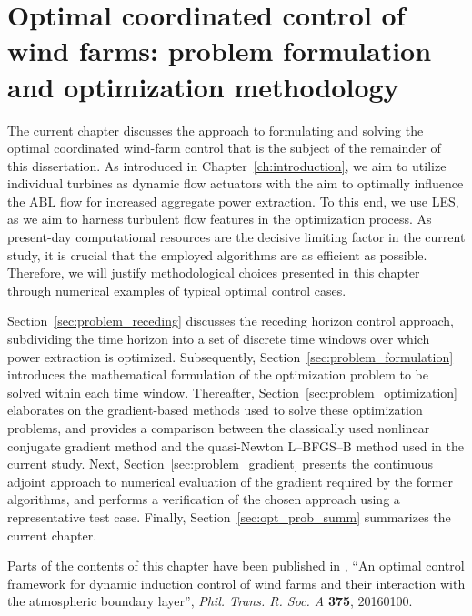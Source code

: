 \chapter{Optimal coordinated control of wind farms: problem formulation and optimization methodology}\label{ch:opt_formulation}

The current chapter discusses the approach to formulating and solving the optimal coordinated wind-farm control that is the subject of the remainder of this dissertation. As introduced in Chapter~\ref{ch:introduction}, we aim to utilize individual turbines as dynamic flow actuators with the aim to optimally influence the ABL flow for increased aggregate power extraction. To this end, we use  LES, as we aim to harness turbulent flow features in the optimization process. As present-day computational resources are the decisive limiting factor in the current study, it is crucial that the employed algorithms are as efficient as possible. Therefore, we will justify methodological choices presented in this chapter through numerical examples of typical optimal control cases. 

Section~\ref{sec:problem_receding} discusses the receding horizon control approach, subdividing the time horizon into a set of discrete time windows over which power extraction is optimized. Subsequently, Section~\ref{sec:problem_formulation} introduces the mathematical formulation of the optimization problem to be solved within each time window. Thereafter, Section~\ref{sec:problem_optimization} elaborates on the gradient-based methods used to solve these optimization problems, and provides a comparison between the classically used nonlinear conjugate gradient method and the quasi-Newton L--BFGS--B method used in the current study. Next, Section~\ref{sec:problem_gradient} presents the continuous adjoint approach to numerical evaluation of the gradient required by the former algorithms, and performs a verification of the chosen approach using a representative test case. Finally, Section~\ref{sec:opt_prob_summ} summarizes the current chapter.

Parts of the contents of this chapter have been published in \cite{munters2017optimal}, ``An optimal control framework for dynamic induction control of wind farms and their interaction with the atmospheric boundary layer'', \emph{Phil. Trans. R. Soc. A} \textbf{375}, 20160100. 

